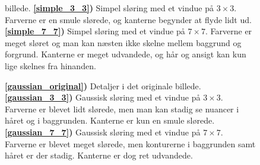 {\begin{figure}[!h]
{        billede.
        \textbf{\ref{simple_3_3})} Simpel sløring med et vindue på $3\times{}3$.
        Farverne er en smule slørede, og kanterne begynder at flyde lidt ud.
        \textbf{\ref{simple_7_7})} Simpel sløring med et vindue på $7\times{}7$.
        Farverne er meget sløret og man kan næsten ikke skelne mellem
        baggrund og forgrund. Kanterne er meget udvandede, og hår og
        ansigt kan kun lige skelnes fra hinanden.
    }
    \label{simple_metode}
\end{figure}
\begin{figure}[!h]
    \centering
    \hspace{1em}
    \hspace{1em}
    \caption[]{
        \textbf{\ref{gaussian_original})} Detaljer i det originale billede.
        \textbf{\ref{gaussian_3_3})} Gaussisk sløring med et vindue på
        $3\times{}3$. Farverne er blevet lidt slørede, men man kan
        stadig se nuancer i håret og i baggrunden. Kanterne er kun en
        smule slørede.
        \textbf{\ref{gaussian_7_7})} Gaussisk sløring med et vindue på
        $7\times{}7$. Farverne er blevet meget slørede, men konturerne i
        baggrunden samt håret er der stadig. Kanterne er dog ret udvandede.
    }
    \label{gaussian_metode}
\end{figure}

}
